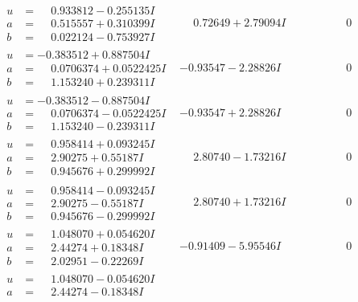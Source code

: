 \documentclass[1p]{elsarticle_modified}
\theoremstyle{definition}
\begin{document}
$$\begin{array}{c|c|c}
\begin{aligned}
u &= \phantom{-}0.933812 - 0.255135 I \\
a &= \phantom{-}0.515557 + 0.310399 I \\
b &= \phantom{-}0.022124 - 0.753927 I\end{aligned}
 & \phantom{-}0.72649 + 2.79094 I & \phantom{-0.000000 } 0 \\ \hline\begin{aligned}
u &= -0.383512 + 0.887504 I \\
a &= \phantom{-}0.0706374 + 0.0522425 I \\
b &= \phantom{-}1.153240 + 0.239311 I\end{aligned}
 & -0.93547 - 2.28826 I & \phantom{-0.000000 } 0 \\ \hline\begin{aligned}
u &= -0.383512 - 0.887504 I \\
a &= \phantom{-}0.0706374 - 0.0522425 I \\
b &= \phantom{-}1.153240 - 0.239311 I\end{aligned}
 & -0.93547 + 2.28826 I & \phantom{-0.000000 } 0 \\ \hline\begin{aligned}
u &= \phantom{-}0.958414 + 0.093245 I \\
a &= \phantom{-}2.90275 + 0.55187 I \\
b &= \phantom{-}0.945676 + 0.299992 I\end{aligned}
 & \phantom{-}2.80740 - 1.73216 I & \phantom{-0.000000 } 0 \\ \hline\begin{aligned}
u &= \phantom{-}0.958414 - 0.093245 I \\
a &= \phantom{-}2.90275 - 0.55187 I \\
b &= \phantom{-}0.945676 - 0.299992 I\end{aligned}
 & \phantom{-}2.80740 + 1.73216 I & \phantom{-0.000000 } 0 \\ \hline\begin{aligned}
u &= \phantom{-}1.048070 + 0.054620 I \\
a &= \phantom{-}2.44274 + 0.18348 I \\
b &= \phantom{-}2.02951 - 0.22269 I\end{aligned}
 & -0.91409 - 5.95546 I & \phantom{-0.000000 } 0 \\ \hline\begin{aligned}
u &= \phantom{-}1.048070 - 0.054620 I \\
a &= \phantom{-}2.44274 - 0.18348 I \\

\end{aligned}
\end{array}$$
\end{document}

